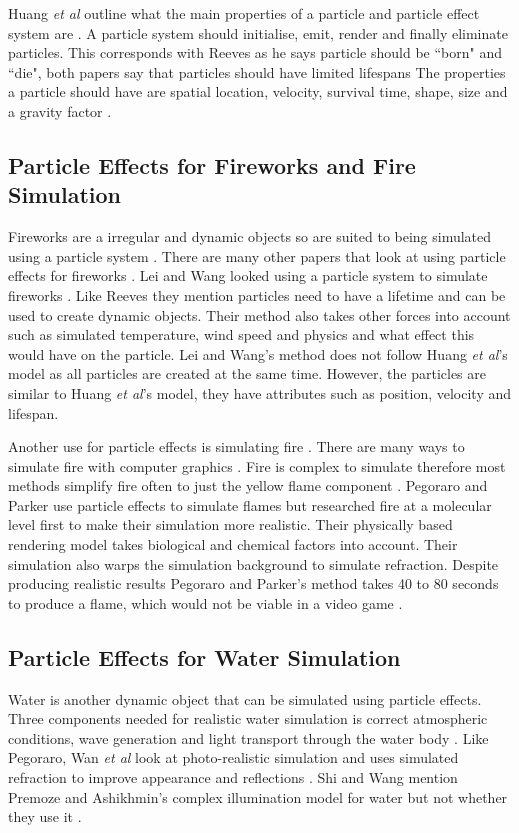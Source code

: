 \documentclass{scrartcl}
\begin{document}
Huang \textit{et al} outline what the main properties of a particle and particle effect system are \cite{Huang}.
A particle system should initialise, emit, render and finally eliminate particles. This corresponds with Reeves as he says particle should be ``born" and ``die", both papers say that particles should have limited lifespans
The properties a particle should have are spatial location, velocity, survival  time, shape, size and a gravity factor \cite{Huang}.

\subsection{Particle Effects for Fireworks and Fire Simulation}
Fireworks are a irregular and dynamic objects so are suited to being simulated using a particle system \cite{Lei, Reeves}. There are many other papers that look at using particle effects for fireworks \cite{Lei, Dong, Zhang}. Lei and Wang looked using a particle system to simulate fireworks \cite{Lei}. Like Reeves they mention particles need to have a lifetime and can be used to create dynamic objects. Their method also takes other forces into account such as simulated temperature, wind speed and physics and what effect this would have on the particle\cite{Lei}. Lei and Wang's method does not follow Huang \textit{et al}'s model as all particles are created at the same time. However, the particles are similar to Huang \textit{et al}'s model, they have attributes such as position, velocity and lifespan.

\bigskip
Another use for particle effects is simulating fire \cite{Pegoraro}. There are many ways to simulate fire with computer graphics \cite{BridaultLouchez, Beaudoin, Lamorlette}. Fire is complex to simulate therefore most methods simplify fire often to just the yellow flame component \cite{Pegoraro}.  Pegoraro and Parker use particle effects to simulate flames but researched fire at a molecular level first to make their simulation more realistic. Their physically based rendering model takes biological and chemical factors into account. Their simulation also warps the simulation background to simulate refraction.  Despite producing realistic results Pegoraro and Parker's method takes 40 to 80 seconds to produce a flame, which would not be viable in a video game \cite{Pegoraro}. 

\subsection{Particle Effects for Water Simulation}
Water is another dynamic object that can be simulated using particle effects. Three components needed for realistic water simulation is correct atmospheric conditions, wave generation and light transport through the water body \cite{Premoze}. Like Pegoraro, Wan \textit{et al} look at photo-realistic simulation and uses simulated refraction to improve appearance and reflections \cite{Pegoraro, Wan}. Shi and Wang mention Premoze and Ashikhmin's complex illumination model for water but not whether they use it \cite{Premoze}.
\end{document}
